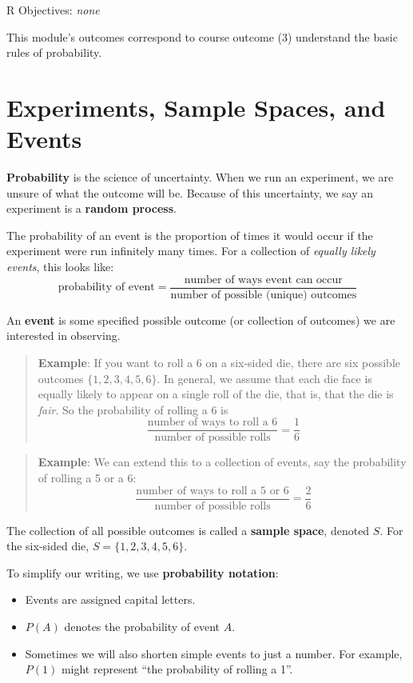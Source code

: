 \documentclass[
]{book}
\providecommand{\tightlist}{%
  \setlength{\itemsep}{0pt}\setlength{\parskip}{0pt}}
\begin{document}
R Objectives: \emph{none}

This module's outcomes correspond to course outcome (3) understand the basic rules of probability.

\section{Experiments, Sample Spaces, and Events}\label{experiments-sample-spaces-and-events}

\textbf{Probability} is the science of uncertainty. When we run an experiment, we are unsure of what the outcome will be. Because of this uncertainty, we say an experiment is a \textbf{random process}.

The probability of an event is the proportion of times it would occur if the experiment were run infinitely many times. For a collection of \emph{equally likely events}, this looks like:
\[
  \text{probability of event} = \frac{\text{number of ways event can occur}}{\text{number of possible (unique) outcomes}}
\]

An \textbf{event} is some specified possible outcome (or collection of outcomes) we are interested in observing.

\begin{quote}
\textbf{Example}: If you want to roll a 6 on a six-sided die, there are six possible outcomes \(\{1,2,3,4,5,6\}\). In general, we assume that each die face is equally likely to appear on a single roll of the die, that is, that the die is \emph{fair}. So the probability of rolling a 6 is \[\frac{\text{number of ways to roll a 6}}{\text{number of possible rolls}} = \frac{1}{6}\]
\end{quote}

\begin{quote}
\textbf{Example}: We can extend this to a collection of events, say the probability of rolling a 5 or a 6: \[\frac{\text{number of ways to roll a 5 or 6}}{\text{number of possible rolls}} = \frac{2}{6}\]
\end{quote}

The collection of all possible outcomes is called a \textbf{sample space}, denoted \(S\). For the six-sided die, \(S=\{1,2,3,4,5,6\}\).

To simplify our writing, we use \textbf{probability notation}:

\begin{itemize}
\tightlist
\item
  Events are assigned capital letters.
\item
  \(P(A)\) denotes the probability of event \(A\).
\item
  Sometimes we will also shorten simple events to just a number. For example, \(P(1)\) might represent ``the probability of rolling a 1''.
\end{itemize}
\end{document}
